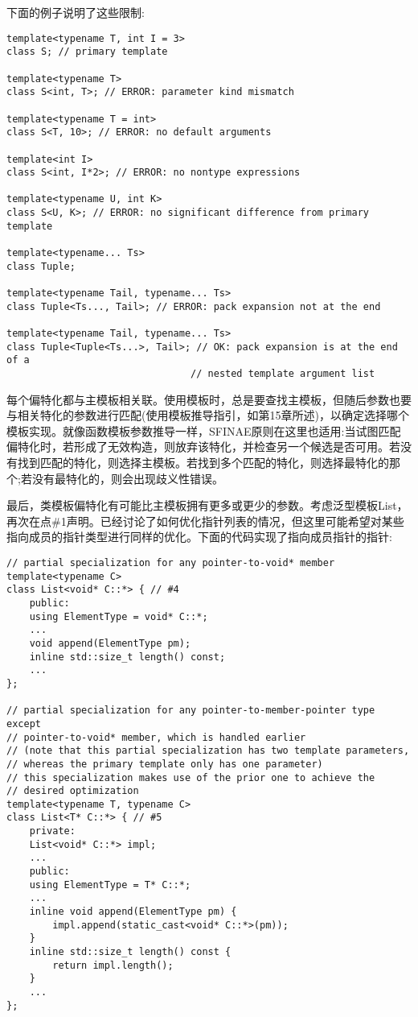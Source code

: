 下面的例子说明了这些限制:

\begin{lstlisting}[style=styleCXX]
template<typename T, int I = 3>
class S; // primary template

template<typename T>
class S<int, T>; // ERROR: parameter kind mismatch

template<typename T = int>
class S<T, 10>; // ERROR: no default arguments

template<int I>
class S<int, I*2>; // ERROR: no nontype expressions

template<typename U, int K>
class S<U, K>; // ERROR: no significant difference from primary template

template<typename... Ts>
class Tuple;

template<typename Tail, typename... Ts>
class Tuple<Ts..., Tail>; // ERROR: pack expansion not at the end

template<typename Tail, typename... Ts>
class Tuple<Tuple<Ts...>, Tail>; // OK: pack expansion is at the end of a
								// nested template argument list
\end{lstlisting}

每个偏特化都与主模板相关联。使用模板时，总是要查找主模板，但随后参数也要与相关特化的参数进行匹配(使用模板推导指引，如第15章所述)，以确定选择哪个模板实现。就像函数模板参数推导一样，SFINAE原则在这里也适用:当试图匹配偏特化时，若形成了无效构造，则放弃该特化，并检查另一个候选是否可用。若没有找到匹配的特化，则选择主模板。若找到多个匹配的特化，则选择最特化的那个;若没有最特化的，则会出现歧义性错误。

最后，类模板偏特化有可能比主模板拥有更多或更少的参数。考虑泛型模板List，再次在点\#1声明。已经讨论了如何优化指针列表的情况，但这里可能希望对某些指向成员的指针类型进行同样的优化。下面的代码实现了指向成员指针的指针:

\begin{lstlisting}[style=styleCXX]
// partial specialization for any pointer-to-void* member
template<typename C>
class List<void* C::*> { // #4
	public:
	using ElementType = void* C::*;
	...
	void append(ElementType pm);
	inline std::size_t length() const;
	...
};

// partial specialization for any pointer-to-member-pointer type except
// pointer-to-void* member, which is handled earlier
// (note that this partial specialization has two template parameters,
// whereas the primary template only has one parameter)
// this specialization makes use of the prior one to achieve the
// desired optimization
template<typename T, typename C>
class List<T* C::*> { // #5
	private:
	List<void* C::*> impl;
	...
	public:
	using ElementType = T* C::*;
	...
	inline void append(ElementType pm) {
		impl.append(static_cast<void* C::*>(pm));
	}
	inline std::size_t length() const {
		return impl.length();
	}
	...
};
\end{lstlisting}

